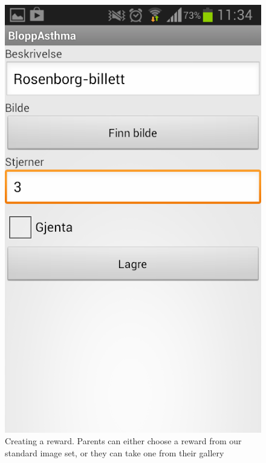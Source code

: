 \begin{figure}
	\begin{minipage}[t]{0.4\linewidth}
		\centering
			\includegraphics[width=0.20\paperwidth]{Pictures/new-screenshots/create-award.png}
		\caption{Creating a reward. Parents can either choose a reward from our standard image set, or they can take one from their gallery}
		\label{fig:parent-create-reward}
	\end{minipage}
	 \hspace{3cm}
	 \begin{minipage}[t]{0.4\linewidth}
		\centering

\end{minipage}
\end{figure}
